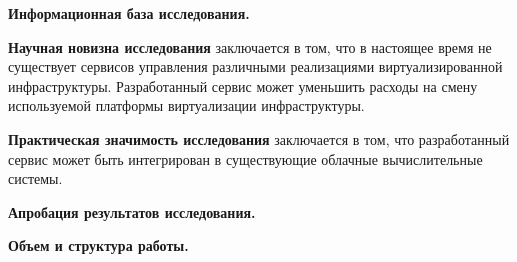 \textbf{Информационная база исследования.} 

\textbf{Научная новизна исследования} заключается в том, что в настоящее время не существует сервисов управления различными реализациями виртуализированной инфраструктуры. Разработанный сервис может уменьшить расходы на смену используемой платформы виртуализации инфраструктуры. 

\textbf{Практическая значимость исследования} заключается в том, что разработанный сервис может быть интегрирован в существующие облачные вычислительные системы.  

\textbf{Апробация результатов исследования.}

\textbf{Объем и структура работы.}